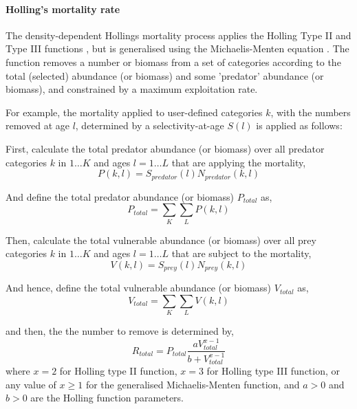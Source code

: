 \paragraph{Holling's mortality rate}

The density-dependent Hollings mortality process applies the Holling Type II and Type III functions \citep{Holling1959}, but is generalised using the Michaelis-Menten equation \citep{MentenMichaelis1913}. The function removes a number or biomass from a set of categories according to the total (selected) abundance (or biomass) and some 'predator' abundance (or biomass), and constrained by a maximum exploitation rate.

For example, the mortality applied to user-defined categories $k$, with the numbers removed at age $l$, determined by a selectivity-at-age $S(l)$ is applied as follows:

First, calculate the total predator abundance (or biomass) over all predator categories $k$ in $1 \ldots K$ and ages $l = 1 \ldots L$ that are applying the mortality,
\begin{equation}
	P(k,l) = S_{predator}(l) N_{predator}(k,l)
\end{equation}

And define the total predator abundance (or biomass) $P_{total}$ as,
\begin{equation}
	P_{total}  = \sum\limits_K {\sum\limits_L {P(k,l)}} 
\end{equation}

Then, calculate the total vulnerable abundance (or biomass) over all prey categories $k$ in $1 \ldots K$ and ages $l = 1 \ldots L$ that are subject to the mortality,
\begin{equation}
	V(k,l) = S_{prey}(l) N_{prey}(k,l)
\end{equation}

And hence, define the total vulnerable abundance (or biomass) $V_{total}$ as,
\begin{equation}
	V_{total}  = \sum\limits_K {\sum\limits_L {V(k,l)}} 
\end{equation}

and then, the the number to remove is determined by,
\begin{equation}
	R_{total} = P_{total} \frac{a  V_{total}^{x-1}}{b + V_{total}^{x-1}}
\end{equation}
where $x=2$ for Holling type II function,  $x=3$ for Holling type III function, or any value of $x \geq 1$ for the generalised Michaelis-Menten function, and $a > 0$ and $b > 0$ are the Holling function parameters.

